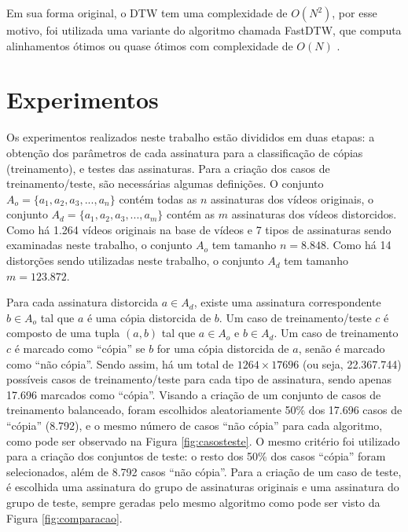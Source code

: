 
Em sua forma original, o DTW tem uma complexidade de $ O(N^{2}) $, por esse motivo, foi utilizada uma variante do algoritmo chamada FastDTW, que computa alinhamentos ótimos ou quase ótimos com complexidade de $O(N)$ \cite{salvador2007toward}.


\section{Experimentos}
\label{sec:met-Experimentos}

Os experimentos realizados neste trabalho estão divididos em duas etapas: a obtenção dos parâmetros de cada assinatura para a classificação de cópias (treinamento), e testes das assinaturas. Para a criação dos casos de treinamento/teste, são necessárias algumas definições. O conjunto $A_o = \{a_1, a_2, a_3, ..., a_n\}$ contém todas as $n$ assinaturas dos vídeos originais, o conjunto $A_d = \{a_1, a_2, a_3, ..., a_m\}$ contém as $m$ assinaturas dos vídeos distorcidos. Como há 1.264 vídeos originais na base de vídeos e 7 tipos de assinaturas sendo examinadas neste trabalho, o conjunto $A_o$ tem tamanho $n=8.848$. Como há 14 distorções sendo utilizadas neste trabalho, o conjunto $A_d$ tem tamanho $m=123.872$.

Para cada assinatura distorcida $a \in A_d$, existe uma assinatura correspondente $b \in A_o$ tal que $a$ é uma cópia distorcida de $b$. Um caso de treinamento/teste $c$ é composto de uma tupla $(a, b)$ tal que $a \in A_o$ e $b \in A_d$. Um caso de treinamento $c$ é marcado como ``cópia'' se $b$ for uma cópia distorcida de $a$, senão é marcado como ``não cópia''. Sendo assim, há um total de $1264 \times 17696$ (ou seja, 22.367.744) possíveis casos de treinamento/teste para cada tipo de assinatura, sendo apenas 17.696 marcados como ``cópia''. Visando a criação de um conjunto de casos de treinamento balanceado, foram escolhidos aleatoriamente 50\% dos 17.696 casos de ``cópia'' (8.792), e o mesmo número de casos ``não cópia'' para cada algoritmo, como pode ser observado na Figura \ref{fig:casosteste}. O mesmo critério foi utilizado para a criação dos conjuntos de teste: o resto dos 50\% dos casos ``cópia'' foram selecionados, além de 8.792 casos ``não cópia''. Para a criação de um caso de teste, é escolhida uma assinatura do grupo de assinaturas originais e uma assinatura do grupo de teste, sempre geradas pelo mesmo algoritmo como pode ser visto da Figura \ref{fig:comparacao}.

